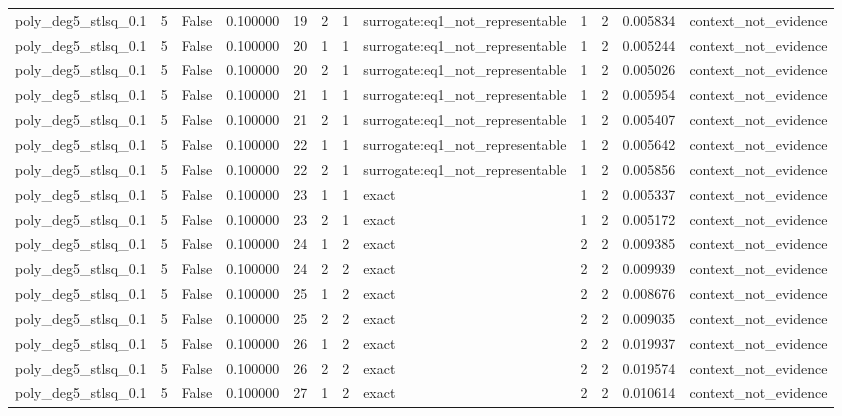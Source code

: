 \begin{tabular}{lrrrrrrlrrrl}
poly\_deg5\_stlsq\_0.1 & 5 & False & 0.100000 & 19 & 2 & 1 & surrogate:eq1\_not\_representable & 1 & 2 & 0.005834 & context\_not\_evidence \\
poly\_deg5\_stlsq\_0.1 & 5 & False & 0.100000 & 20 & 1 & 1 & surrogate:eq1\_not\_representable & 1 & 2 & 0.005244 & context\_not\_evidence \\
poly\_deg5\_stlsq\_0.1 & 5 & False & 0.100000 & 20 & 2 & 1 & surrogate:eq1\_not\_representable & 1 & 2 & 0.005026 & context\_not\_evidence \\
poly\_deg5\_stlsq\_0.1 & 5 & False & 0.100000 & 21 & 1 & 1 & surrogate:eq1\_not\_representable & 1 & 2 & 0.005954 & context\_not\_evidence \\
poly\_deg5\_stlsq\_0.1 & 5 & False & 0.100000 & 21 & 2 & 1 & surrogate:eq1\_not\_representable & 1 & 2 & 0.005407 & context\_not\_evidence \\
poly\_deg5\_stlsq\_0.1 & 5 & False & 0.100000 & 22 & 1 & 1 & surrogate:eq1\_not\_representable & 1 & 2 & 0.005642 & context\_not\_evidence \\
poly\_deg5\_stlsq\_0.1 & 5 & False & 0.100000 & 22 & 2 & 1 & surrogate:eq1\_not\_representable & 1 & 2 & 0.005856 & context\_not\_evidence \\
poly\_deg5\_stlsq\_0.1 & 5 & False & 0.100000 & 23 & 1 & 1 & exact & 1 & 2 & 0.005337 & context\_not\_evidence \\
poly\_deg5\_stlsq\_0.1 & 5 & False & 0.100000 & 23 & 2 & 1 & exact & 1 & 2 & 0.005172 & context\_not\_evidence \\
poly\_deg5\_stlsq\_0.1 & 5 & False & 0.100000 & 24 & 1 & 2 & exact & 2 & 2 & 0.009385 & context\_not\_evidence \\
poly\_deg5\_stlsq\_0.1 & 5 & False & 0.100000 & 24 & 2 & 2 & exact & 2 & 2 & 0.009939 & context\_not\_evidence \\
poly\_deg5\_stlsq\_0.1 & 5 & False & 0.100000 & 25 & 1 & 2 & exact & 2 & 2 & 0.008676 & context\_not\_evidence \\
poly\_deg5\_stlsq\_0.1 & 5 & False & 0.100000 & 25 & 2 & 2 & exact & 2 & 2 & 0.009035 & context\_not\_evidence \\
poly\_deg5\_stlsq\_0.1 & 5 & False & 0.100000 & 26 & 1 & 2 & exact & 2 & 2 & 0.019937 & context\_not\_evidence \\
poly\_deg5\_stlsq\_0.1 & 5 & False & 0.100000 & 26 & 2 & 2 & exact & 2 & 2 & 0.019574 & context\_not\_evidence \\
poly\_deg5\_stlsq\_0.1 & 5 & False & 0.100000 & 27 & 1 & 2 & exact & 2 & 2 & 0.010614 & context\_not\_evidence \\

\end{tabular}
